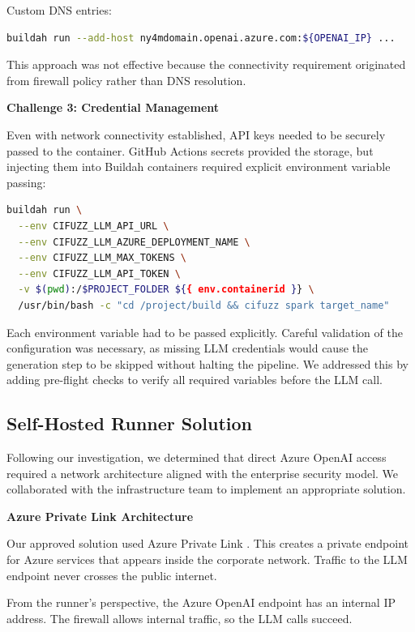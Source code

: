 Custom DNS entries:
\begin{lstlisting}[language=bash]
buildah run --add-host ny4mdomain.openai.azure.com:${OPENAI_IP} ...
\end{lstlisting}
This approach was not effective because the connectivity requirement originated from firewall policy rather than DNS resolution.

\textbf{Challenge 3: Credential Management}

Even with network connectivity established, API keys needed to be securely passed to the container. GitHub Actions secrets provided the storage, but injecting them into Buildah containers required explicit environment variable passing:

\begin{lstlisting}[language=bash]
buildah run \
  --env CIFUZZ_LLM_API_URL \
  --env CIFUZZ_LLM_AZURE_DEPLOYMENT_NAME \
  --env CIFUZZ_LLM_MAX_TOKENS \
  --env CIFUZZ_LLM_API_TOKEN \
  -v $(pwd):/$PROJECT_FOLDER ${{ env.containerid }} \
  /usr/bin/bash -c "cd /project/build && cifuzz spark target_name"
\end{lstlisting}

Each environment variable had to be passed explicitly. Careful validation of the configuration was necessary, as missing LLM credentials would cause the generation step to be skipped without halting the pipeline. We addressed this by adding pre-flight checks to verify all required variables before the LLM call.

\subsection{Self-Hosted Runner Solution}

Following our investigation, we determined that direct Azure OpenAI access required a network architecture aligned with the enterprise security model. We collaborated with the infrastructure team to implement an appropriate solution.

\textbf{Azure Private Link Architecture}

Our approved solution used Azure Private Link \cite{azure_private_link}. This creates a private endpoint for Azure services that appears inside the corporate network. Traffic to the LLM endpoint never crosses the public internet.

From the runner's perspective, the Azure OpenAI endpoint has an internal IP address. The firewall allows internal traffic, so the LLM calls succeed.

